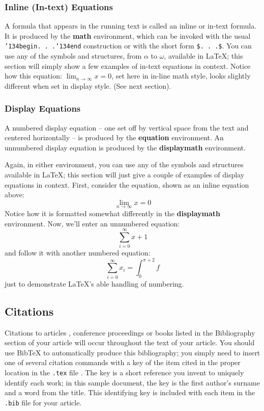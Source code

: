 \documentclass{sig-alternate-05-2015}
\begin{document}
\subsubsection{Inline (In-text) Equations}
A formula that appears in the running text is called an
inline or in-text formula.  It is produced by the
\textbf{math} environment, which can be
invoked with the usual \texttt{{\char'134}begin. . .{\char'134}end}
construction or with the short form \texttt{\$. . .\$}. You
can use any of the symbols and structures,
from $\alpha$ to $\omega$, available in
\LaTeX\cite{Lamport:LaTeX}; this section will simply show a
few examples of in-text equations in context. Notice how
this equation: \begin{math}\lim_{n\rightarrow \infty}x=0\end{math},
set here in in-line math style, looks slightly different when
set in display style.  (See next section).

\subsubsection{Display Equations}
A numbered display equation -- one set off by vertical space
from the text and centered horizontally -- is produced
by the \textbf{equation} environment. An unnumbered display
equation is produced by the \textbf{displaymath} environment.

Again, in either environment, you can use any of the symbols
and structures available in \LaTeX; this section will just
give a couple of examples of display equations in context.
First, consider the equation, shown as an inline equation above:
\begin{equation}\lim_{n\rightarrow \infty}x=0\end{equation}
Notice how it is formatted somewhat differently in
the \textbf{displaymath}
environment.  Now, we'll enter an unnumbered equation:
\begin{displaymath}\sum_{i=0}^{\infty} x + 1\end{displaymath}
and follow it with another numbered equation:
\begin{equation}\sum_{i=0}^{\infty}x_i=\int_{0}^{\pi+2} f\end{equation}
just to demonstrate \LaTeX's able handling of numbering.

\subsection{Citations}
Citations to articles \cite{bowman:reasoning,
clark:pct, braams:babel, herlihy:methodology},
conference proceedings \cite{clark:pct} or
books \cite{salas:calculus, Lamport:LaTeX} listed
in the Bibliography section of your
article will occur throughout the text of your article.
You should use BibTeX to automatically produce this bibliography;
you simply need to insert one of several citation commands with
a key of the item cited in the proper location in
the \texttt{.tex} file \cite{Lamport:LaTeX}.
The key is a short reference you invent to uniquely
identify each work; in this sample document, the key is
the first author's surname and a
word from the title.  This identifying key is included
with each item in the \texttt{.bib} file for your article.
\end{document}
